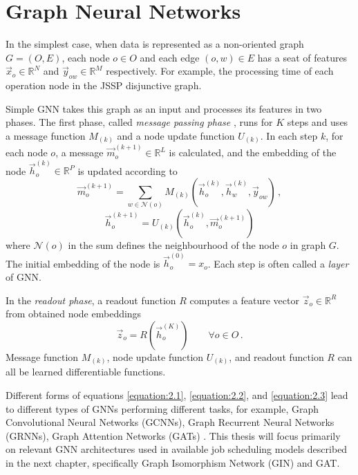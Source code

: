 \section{Graph Neural Networks}

In the simplest case, when data is represented as a non-oriented graph $G = (O, E)$, each node $o \in O$ and each edge $(o, w) \in E$ has a seat of features $\vec{x}_o \in \mathbb{R}^N$ and $\vec{y}_{ow} \in \mathbb{R}^M$ respectively. For example, the processing time of each operation node in the JSSP disjunctive graph. 
\par
Simple GNN takes this graph as an input and processes its features in two phases. The first phase, called \textit{message passing phase} \cite{pmlr-v70-gilmer17a}, runs for $K$ steps and uses a message function $M_{(k)}$ and a node update function $U_{(k)}$. In each step $k$, for each node $o$, a message $\vec{m}_o^{(k + 1)} \in \mathbb{R}^L$ is calculated, and the embedding of the node $\vec{h}_o^{(k)} \in \mathbb{R}^P$ is updated according to \cite{pmlr-v70-gilmer17a}
\begin{equation}\label{equation:2.1}
	\vec{m}_o^{(k + 1)} = \sum_{w \in \mathcal{N}(o)} M_{(k)} \left(\vec{h}_o^{(k)}, \vec{h}_w^{(k)}, \vec{y}_{ow} \right) \, ,
\end{equation}
\begin{equation}\label{equation:2.2}
	\vec{h}_o^{(k+1)} = U_{(k)} \left(\vec{h}_o^{(k)}, \vec{m}_o^{(k+1)}\right)
\end{equation}
where $\mathcal{N}(o)$ in the sum defines the neighbourhood of the node $o$ in graph $G$. The initial embedding of the node is $\vec{h}_o^{(0)} = x_o$. Each step is often called a \textit{layer} of GNN.
\par
In the \textit{readout phase}, a readout function $R$ computes a feature vector $\vec{z}_o \in \mathbb{R}^R$ from obtained node embeddings \cite{pmlr-v70-gilmer17a}
\begin{equation}\label{equation:2.3}
	\vec{z}_o = R\left(\vec{h}_o^{(K)}\right) \hspace{2em} \forall o \in O \, .
\end{equation}
Message function $M_{(k)}$, node update function $U_{(k)}$, and readout function $R$ can all be learned differentiable functions.
\par
Different forms of equations \ref{equation:2.1}, \ref{equation:2.2}, and \ref{equation:2.3} lead to different types of GNNs performing different tasks, for example, Graph Convolutional Neural Networks (GCNNs), Graph Recurrent Neural Networks (GRNNs), Graph Attention Networks (GATs) \cite{sanchez-lengeling2021a, 10.1145/3495161}. This thesis will focus primarily on relevant GNN architectures used in available job scheduling models described in the next chapter, specifically Graph Isomorphism Network (GIN) and GAT.

